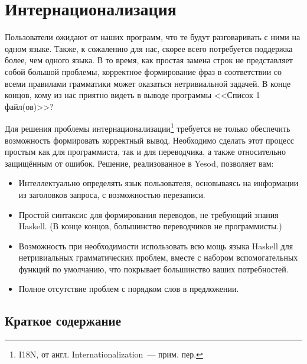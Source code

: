 \chapter{Интернационализация}\label{chap:i18n}

Пользователи ожидают от наших программ, что те будут разговаривать с ними на
одном языке. Также, к сожалению для нас, скорее всего потребуется поддержка
более, чем одного языка. В то время, как простая замена строк не представляет
собой большой проблемы, корректное формирование фраз в соответствии со всеми
правилами грамматики может оказаться нетривиальной задачей. В конце концов,
кому из нас приятно видеть в выводе программы <<Список 1 файл(ов)>>?

Для решения проблемы интернационализации\footnote{I18N, от англ.
    Internationalization~--- прим. пер.} требуется не только обеспечить
возможность формировать корректный вывод. Необходимо сделать этот процесс
простым как для программиста, так и для переводчика, а также относительно
защищённым от ошибок. Решение, реализованное в Yesod, позволяет вам:

\begin{itemize}
  \item Интеллектуально определять язык пользователя, основываясь на информации
      из заголовков запроса, с возможностью перезаписи.

  \item Простой синтаксис для формирования переводов, не требующий знания
      Haskell. (В конце концов, большинство переводчиков не программисты.)

  \item Возможность при необходимости использовать всю мощь языка Haskell для
      нетривиальных грамматических проблем, вместе с набором вспомогательных
      функций по умолчанию, что покрывает большинство ваших потребностей.

  \item Полное отсутствие проблем с порядком слов в предложении.
\end{itemize}

\section{Краткое содержание}



